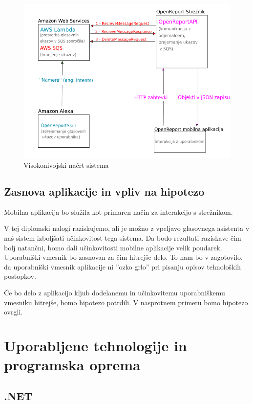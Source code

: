 \documentclass[a4paper, 12pt]{book}
\begin{document}
\begin{figure}[H]
\begin{center}
\includegraphics[width=13cm]{plan}
\end{center}
\caption{Visokonivojski načrt sistema}
\label{plan}
\end{figure}

\subsection{Zasnova aplikacije in vpliv na hipotezo}

Mobilna aplikacija bo služila kot primaren način za interakcijo s strežnikom.

V tej diplomski nalogi raziskujemo, ali je možno z vpeljavo glasovnega asistenta v naš sistem izboljšati učinkovitost tega sistema.
Da bodo rezultati raziskave čim bolj natančni, bomo dali učinkovitosti mobilne aplikacije velik poudarek.
Uporabniški vmesnik bo zasnovan za čim hitrejše delo.
To nam bo v zagotovilo, da uporabniški vmesnik aplikacije ni ''ozko grlo'' pri pisanju opisov tehnoloških postopkov.

Če bo delo z aplikacijo kljub dodelanemu in učinkovitemu uporabniškemu vmesniku hitrejše, bomo hipotezo potrdili.
V nasprotnem primeru bomo hipotezo ovrgli.

\section{Uporabljene tehnologije in programska oprema}

\subsection{.NET}
\end{document}
